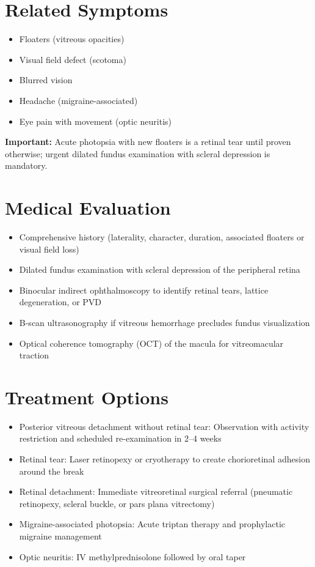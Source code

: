 \section*{Related Symptoms}
\begin{itemize}
  \item Floaters (vitreous opacities)
  \item Visual field defect (scotoma)
  \item Blurred vision
  \item Headache (migraine-associated)
  \item Eye pain with movement (optic neuritis)
\end{itemize}
\textbf{Important:} Acute photopsia with new floaters is a retinal tear until proven otherwise; urgent dilated fundus examination with scleral depression is mandatory.

\section*{Medical Evaluation}
\begin{itemize}
  \item Comprehensive history (laterality, character, duration, associated floaters or visual field loss)
  \item Dilated fundus examination with scleral depression of the peripheral retina
  \item Binocular indirect ophthalmoscopy to identify retinal tears, lattice degeneration, or PVD
  \item B-scan ultrasonography if vitreous hemorrhage precludes fundus visualization
  \item Optical coherence tomography (OCT) of the macula for vitreomacular traction
\end{itemize}

\section*{Treatment Options}
\begin{itemize}
  \item Posterior vitreous detachment without retinal tear: Observation with activity restriction and scheduled re-examination in 2--4 weeks
  \item Retinal tear: Laser retinopexy or cryotherapy to create chorioretinal adhesion around the break
  \item Retinal detachment: Immediate vitreoretinal surgical referral (pneumatic retinopexy, scleral buckle, or pars plana vitrectomy)
  \item Migraine-associated photopsia: Acute triptan therapy and prophylactic migraine management
  \item Optic neuritis: IV methylprednisolone followed by oral taper
\end{itemize}

